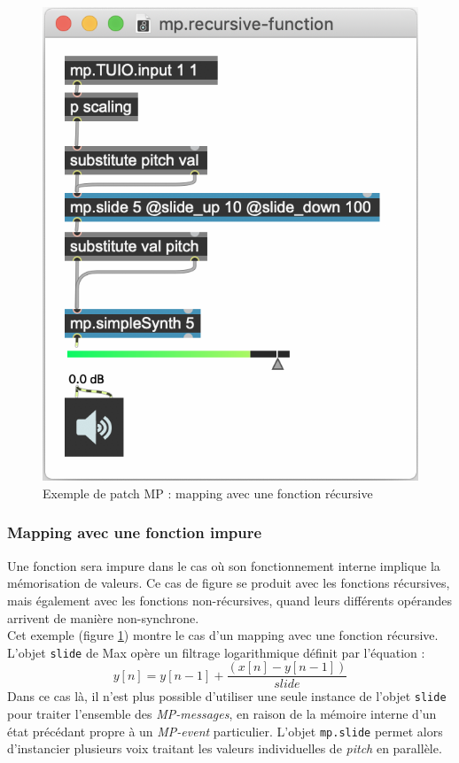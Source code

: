 \begin{figure}[!htbp]
\begin{minipage}[t]{0.485\textwidth}
	  	\includegraphics[width=\linewidth]{gfx/04_algorithms/MP-mappingRecursive.png}
		\caption[Exemple de patch MP : fonction récursive]{Exemple de patch MP : mapping avec une fonction récursive}
		\label{fig:algorithms:MP-recursive}
	\end{minipage}
\end{figure}

\subsubsection{Mapping avec une fonction impure}

\noindent Une fonction sera impure dans le cas où son fonctionnement interne implique la mémorisation de valeurs. Ce cas de figure se produit avec les fonctions récursives, mais également avec les fonctions non-récursives, quand leurs différents opérandes arrivent de manière non-synchrone.\\
\indent Cet exemple (figure \ref{fig:algorithms:MP-recursive}) montre le cas d'un mapping avec une fonction récursive. L'objet \verb|slide| de Max opère un filtrage logarithmique définit par l'équation :
 $$y[n] = y[n-1] + \frac{(x[n]-y[n-1])}{slide}$$ 
\noindent Dans ce cas là, il n'est plus possible d'utiliser une seule instance de l'objet \verb|slide| pour traiter l'ensemble des \textit{MP-messages}, en raison de la mémoire interne d'un état précédant propre à un \textit{MP-event} particulier. L'objet \verb|mp.slide| permet alors d'instancier plusieurs voix traitant les valeurs individuelles de \textit{pitch} en parallèle.


